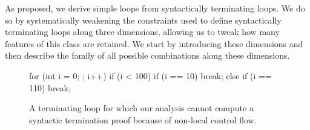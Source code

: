 As proposed, we derive simple loops from syntactically terminating loops. We do so by systematically weakening the constraints used to define syntactically terminating loops along three dimensions, allowing us to tweak how many features of this class are retained. We start by introducing these dimensions and then describe the family of all possible combinations along these dimensions.

\begin{figure}
\begin{minipage}{.38\linewidth}
    \begin{ccode}
for (int i = 0; ; i++) {
    if (i < 100) {
        if (i == 10) break;
    } else {
        if (i == 110) break;
    }
}
    \end{ccode}
\end{minipage}
\hfill
\begin{minipage}{.58\linewidth}
\end{minipage}
\caption{A terminating loop for which our analysis cannot compute a syntactic termination proof because of non-local control flow.}
\label{fig:terminating_not_synt}
\end{figure}

